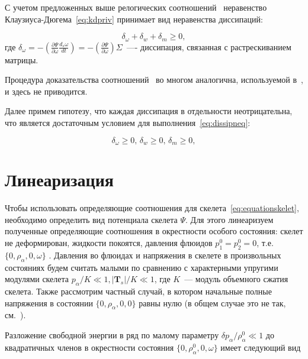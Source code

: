 С учетом предложенных выше релогических соотношений~ неравенство Клаузиуса-Дюгема~\eqref{eq:kdpriv} принимает вид неравенства диссипаций:

\begin{equation}
  \label{eq:dissipneq}
  \delta_{\omega} + \delta_w + \delta_m \geq 0,
\end{equation}
где $\delta_{\omega} = - \left( \frac{\partial \Psi}{\partial \omega} \frac{d_s \omega}{d t} \right) = - \left( \frac{\partial \Psi}{\partial \omega} \right) \Sigma$~---- диссипация, связанная с растрескиванием матрицы.

Процедура доказательства соотношений~ во многом аналогична, используемой в~\autocite{kondaurov2007}, и здесь не приводится.

Далее примем гипотезу, что каждая диссипация в отдельности неотрицательна, что является достаточным условием для выполнения~\eqref{eq:dissipneq}:

\begin{equation}
  \label{eq:dissipneq2}
  \delta_{\omega} \geq 0, \, \delta_w \geq 0, \, \delta_m \geq 0,
\end{equation}

\section{Линеаризация}\label{sec:ch1/sec03}

Чтобы использовать определяющие соотношения для скелета~\eqref{eq:equationskelet}, необходимо определить вид потенциала скелета $\Psi$. Для этого линеаризуем полученные определяющие соотношения в окрестности особого состояния: скелет не деформирован, жидкости покоятся, давления флюидов $p_1^0 = p_2^0 = 0$, т.е. $\{ 0, \rho_{\alpha}, 0, \omega \}$ . Давления во флюидах и напряжения в скелете в произвольных состояниях будем считать малыми по сравнению с характерными упругими модулями скелета $p_{\alpha}/K \ll 1, |\textbf{T}_s|/K \ll 1$, где $K$~--- модуль объемного сжатия скелета. Также рассмотрим частный случай, в котором начальные полные напряжения в состоянии  $ \{ 0, \rho_{\alpha}, 0, 0 \} $ равны нулю (в общем случае это не так, см.~\autocite{muha2018}).

Разложение свободной энергии в ряд по малому параметру $ \delta p_{\alpha} / \rho_{\alpha}^0 \ll 1$ до квадратичных членов в окрестности состояния $\{ 0, \rho_{\alpha}^0, 0, \omega \}$ имеет следующий вид

